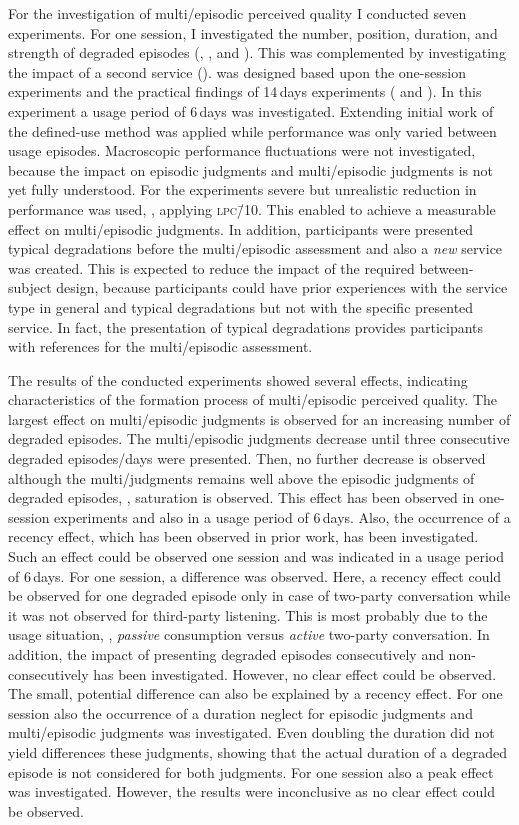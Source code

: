 For the investigation of multi\-/episodic perceived quality I conducted seven experiments.
For one session, I investigated the number, position, duration, and strength of degraded episodes (, \EIIa{}, and ).
This was complemented by investigating the impact of a second service (\EIIb{}).
 was designed based upon the one-session experiments and the practical findings of 14\,days experiments ( and ).
In this experiment a usage period of 6\,days was investigated.
Extending initial work of \citet{moller_single-call_2011} the defined-use method was applied while performance was only varied between usage episodes.
Macroscopic performance fluctuations were not investigated, because the impact on episodic judgments and multi\-/episodic judgments is not yet fully understood.
For the experiments severe but unrealistic reduction in performance was used, \ie, applying \textsc{\lowercase{LPC\=/10}}.
This enabled to achieve a measurable effect on multi\-/episodic judgments.
In addition, participants were presented typical degradations before the multi\-/episodic assessment and also a \emph{new} service was created.
This is expected to reduce the impact of the required between-subject design, because participants could have prior experiences with the service type in general and typical degradations but not with the specific presented service.
In fact, the presentation of typical degradations provides participants with references for the multi\-/episodic assessment.

The results of the conducted experiments showed several effects, indicating characteristics of the formation process of multi\-/episodic perceived quality.
The largest effect on multi\-/episodic judgments is observed for an increasing number of degraded episodes.
The multi\-/episodic judgments decrease until three consecutive degraded episodes/days were presented.
Then, no further decrease is observed although the multi\-/judgments remains well above the episodic judgments of degraded episodes, \ie, saturation is observed.
This effect has been observed in one-session experiments and also in a usage period of 6\,days.
Also, the occurrence of a recency effect, which has been observed in prior work, has been investigated.
Such an effect could be observed one session and was indicated in a usage period of 6\,days.
For one session, a difference was observed.
Here, a recency effect could be observed for one degraded episode only in case of two-party conversation while it was not observed for third-party listening.
This is most probably due to the usage situation, \ie, \emph{passive} consumption versus \emph{active} two-party conversation.
In addition, the impact of presenting degraded episodes consecutively and non-consecutively has been investigated.
However, no clear effect could be observed.
The small, potential difference can also be explained by a recency effect.
For one session also the occurrence of a duration neglect for episodic judgments and multi\-/episodic judgments was investigated.
Even doubling the duration did not yield differences these judgments, showing that the actual duration of a degraded episode is not considered for both judgments.
For one session also a peak effect was investigated.
However, the results were inconclusive as no clear effect could be observed.

